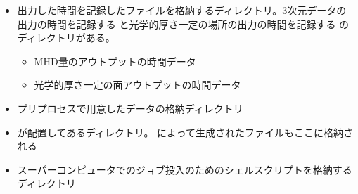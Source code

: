 \documentclass[letterpaper,10pt,dvipdfmx,report]{sphinxmanual}
\begin{document}
\begin{itemize}
\begin{description}
\begin{itemize}
\begin{description}
\end{description}

\item {} \begin{description}
\sphinxAtStartPar
出力した時間を記録したファイルを格納するディレクトリ。3次元データの出力の時間を記録する  と光学的厚さ一定の場所の出力の時間を記録する  のディレクトリがある。
\begin{itemize}
\item {} \begin{description}
\sphinxAtStartPar
MHD量のアウトプットの時間データ

\end{description}

\item {} \begin{description}
\sphinxAtStartPar
光学的厚さ一定の面アウトプットの時間データ

\end{description}

\end{itemize}

\end{description}

\item {} \begin{description}
\sphinxAtStartPar
プリプロセスで用意したデータの格納ディレクトリ

\end{description}

\item {} \begin{description}
\sphinxAtStartPar
{} が配置してあるディレクトリ。  によって生成されたファイルもここに格納される

\end{description}

\item {} \begin{description}
\sphinxAtStartPar
スーパーコンピュータでのジョブ投入のためのシェルスクリプトを格納するディレクトリ


\end{description}
\end{itemize}
\end{description}
\end{itemize}
\end{document}
